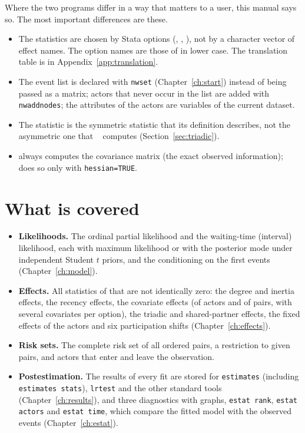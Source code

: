 Where the two programs differ in a way that matters to a user, this manual says so. The most important differences are these.
\begin{itemize}[nosep]
  \item The statistics are chosen by Stata options (, , ), not by a character vector of effect names. The option names are those of \relevent{} in lower case. The translation table is in Appendix~\ref{app:translation}.
  \item The event list is declared with \texttt{nwset} (Chapter~\ref{ch:start}) instead of being passed as a matrix; actors that never occur in the list are added with \texttt{nwaddnodes}; the attributes of the actors are variables of the current dataset.
  \item The statistic  is the symmetric statistic that its definition describes, not the asymmetric one that \relevent{}~\releventver{} computes (Section~\ref{sec:triadic}).
  \item \nwrem{} always computes the covariance matrix (the exact observed information); \relevent{} does so only with \texttt{hessian=TRUE}.
\end{itemize}

\section{What is covered}

\begin{itemize}[nosep]
  \item \textbf{Likelihoods.} The ordinal partial likelihood and the waiting-time (interval) likelihood, each with maximum likelihood or with the posterior mode under independent Student $t$ priors, and the conditioning on the first events (Chapter~\ref{ch:model}).
  \item \textbf{Effects.} All statistics of \relevent{} that are not identically zero: the degree and inertia effects, the recency effects, the covariate effects (of actors and of pairs, with several covariates per option), the triadic and shared-partner effects, the fixed effects of the actors and six participation shifts (Chapter~\ref{ch:effects}).
  \item \textbf{Risk sets.} The complete risk set of all ordered pairs, a restriction to given pairs, and actors that enter and leave the observation.
  \item \textbf{Postestimation.} The results of every fit are stored for \texttt{estimates} (including \texttt{estimates stats}), \texttt{lrtest} and the other standard tools (Chapter~\ref{ch:results}), and three diagnostics with graphs, \texttt{estat rank}, \texttt{estat actors} and \texttt{estat time}, which compare the fitted model with the observed events (Chapter~\ref{ch:estat}).
\end{itemize}

